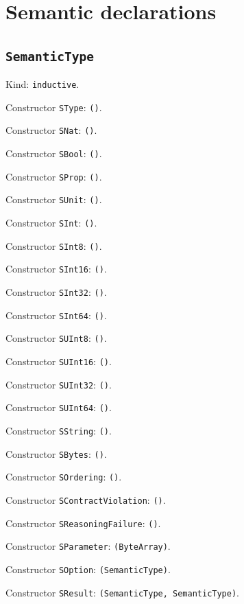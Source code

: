 \documentclass[11pt]{article}
\begin{document}
\section*{Semantic declarations}
\subsection*{\texttt{SemanticType}}
\noindent Kind: \texttt{inductive}.\par
\noindent Constructor \texttt{SType}: \texttt{()}.\par
\noindent Constructor \texttt{SNat}: \texttt{()}.\par
\noindent Constructor \texttt{SBool}: \texttt{()}.\par
\noindent Constructor \texttt{SProp}: \texttt{()}.\par
\noindent Constructor \texttt{SUnit}: \texttt{()}.\par
\noindent Constructor \texttt{SInt}: \texttt{()}.\par
\noindent Constructor \texttt{SInt8}: \texttt{()}.\par
\noindent Constructor \texttt{SInt16}: \texttt{()}.\par
\noindent Constructor \texttt{SInt32}: \texttt{()}.\par
\noindent Constructor \texttt{SInt64}: \texttt{()}.\par
\noindent Constructor \texttt{SUInt8}: \texttt{()}.\par
\noindent Constructor \texttt{SUInt16}: \texttt{()}.\par
\noindent Constructor \texttt{SUInt32}: \texttt{()}.\par
\noindent Constructor \texttt{SUInt64}: \texttt{()}.\par
\noindent Constructor \texttt{SString}: \texttt{()}.\par
\noindent Constructor \texttt{SBytes}: \texttt{()}.\par
\noindent Constructor \texttt{SOrdering}: \texttt{()}.\par
\noindent Constructor \texttt{SContractViolation}: \texttt{()}.\par
\noindent Constructor \texttt{SReasoningFailure}: \texttt{()}.\par
\noindent Constructor \texttt{SParameter}: \texttt{(ByteArray)}.\par
\noindent Constructor \texttt{SOption}: \texttt{(SemanticType)}.\par
\noindent Constructor \texttt{SResult}: \texttt{(SemanticType, SemanticType)}.\par
\end{document}
